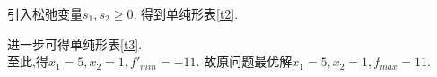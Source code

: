 \documentclass[11pt,AutoFakeBold]{article}
\begin{document}
\begin{enumerate}
引入松弛变量$s_1,s_2\geqslant 0$, 得到单纯形表\ref{t2}.
        \begin{table}[!htbp]
        \centering
        \caption{第四题(1)单纯形表2}
        \label{t2}
        \end{table}
进一步可得单纯形表\ref{t3}.\\至此,得$x_1=5,x_2=1,f'_{min}=-11.$
故原问题最优解$x_1=5,x_2=1,f_{max}=11.$
        \begin{table}[!htbp]
        \centering
        \caption{第四题(1)单纯形表3}
        \label{t3}
\end{table}
\end{enumerate}
\end{document}
